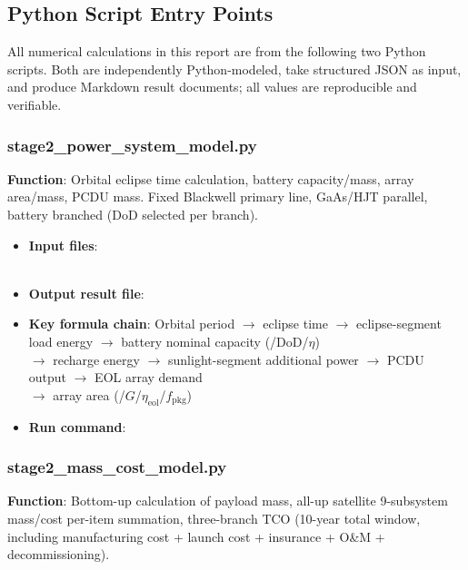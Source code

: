 \subsection{Python Script Entry Points}
\label{sec:script-entry}

All numerical calculations in this report are from the following two Python scripts. Both are independently Python-modeled, take structured JSON as input, and produce Markdown result documents; all values are reproducible and verifiable.

\subsubsection{stage2\_power\_system\_model.py}

\textbf{Function}: Orbital eclipse time calculation, battery capacity/mass, array area/mass, PCDU mass. Fixed Blackwell primary line, GaAs/HJT parallel, battery branched (DoD selected per branch).

\begin{itemize}
  \item \textbf{Input files}:\\
    \\
  \item \textbf{Output result file}:\\
  \item \textbf{Key formula chain}: Orbital period $\to$ eclipse time $\to$ eclipse-segment load energy $\to$ battery nominal capacity (/DoD/$\eta$)\\
    $\to$ recharge energy $\to$ sunlight-segment additional power $\to$ PCDU output $\to$ EOL array demand\\
    $\to$ array area (/$G$/$\eta_{\text{eol}}$/$f_{\text{pkg}}$)
  \item \textbf{Run command}: 
\end{itemize}

\subsubsection{stage2\_mass\_cost\_model.py}

\textbf{Function}: Bottom-up calculation of payload mass, all-up satellite 9-subsystem mass/cost per-item summation, three-branch TCO (10-year total window, including manufacturing cost + launch cost + insurance + O\&M + decommissioning).

